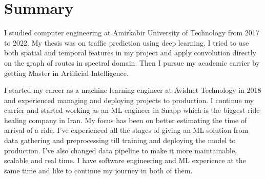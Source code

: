 \section{Summary}\closesection{}

I studied computer engineering at Amirkabir University of Technology from 2017 to 2022.
My thesis was on traffic prediction using deep learning.
I tried to use both spatial and temporal features in my project and apply
convolution directly on the graph of routes in spectral domain.
Then I pursue my academic carrier by getting Master in Artificial Intelligence.

I started my career as a machine learning engineer at Avidnet Technology in 2018 and experienced managing
and deploying projects to production.
I continue my carrier and started working as an ML engineer in Snapp which is the biggest ride healing company in Iran.
My focus has been on better estimating the time of arrival of a ride.
I've experienced all the stages of giving an ML solution from data gathering and preprocessing
till training and deploying the model to production.
I've also changed data pipeline to make it more maintainable, scalable and real time.
I have software engineering and ML experience at the same time and like to continue my journey in both of them.